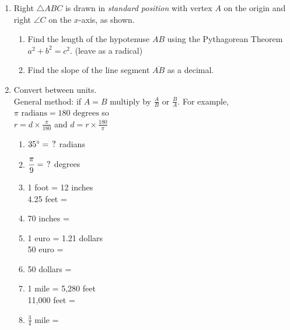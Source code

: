 \begin{enumerate}
\item Right $\triangle ABC$ is drawn in \emph{standard position} with vertex $A$ on the origin and right $\angle C$ on the $x$-axis, as shown.
\begin{multicols}{2}
  \raggedcolumns
\begin{enumerate}
  \item Find the length of the hypotenuse $AB$ using the Pythagorean Theorem $a^2 + b^2 = c^2$. (leave as a radical)
  \vspace{3cm}
  \item Find the slope of the line segment $\overline{AB}$ as a decimal.
\end{enumerate}
\end{multicols}

\newpage
\item Convert between units. \\[0.25cm]
General method: if $A = B$ multiply by $\displaystyle \frac{A}{B} \text{ or } \frac{B}{A}$. For example, $\pi \text{ radians}= 180 \text{ degrees}$ so \\
$\displaystyle r = d \times \frac{\pi}{180}$ and 
$\displaystyle d = r \times \frac{180}{\pi}$
\vspace{0.5cm}
  \begin{multicols}{2}
  \raggedcolumns
  \begin{enumerate}[itemsep=1.5cm]
    \item $35^\circ = \hspace{0.15cm} ?$ radians
    \item $\displaystyle \frac{\pi}{9}  = \hspace{0.15cm} ?$ degrees
    \item 1 foot = 12 inches\\[0.5cm]
    4.25 feet = 
    \item 70 inches = 
    \item 1 euro = 1.21 dollars\\[0.5cm]
    50 euro = 
    \item 50 dollars = 
    \item 1 mile = 5,280 feet\\[0.5cm]
    11,000 feet = 
    \item $\displaystyle \frac{3}{4}$ mile =   
  \end{enumerate}
  \end{multicols}
 

\end{enumerate}
